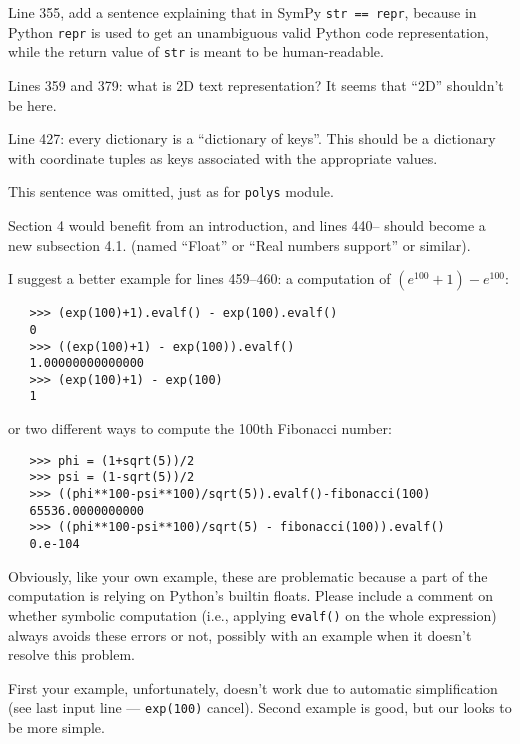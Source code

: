 \documentclass[answers,12pt]{exam}
\begin{document}
\begin{questions}
\question Line 355, add a sentence explaining that in SymPy \texttt{str == repr}, because in Python \texttt{repr} is used to get an unambiguous valid Python code representation, while the return value of \texttt{str} is meant to be human-readable.
\begin{solution}

\end{solution}

\question Lines 359 and 379: what is 2D text representation? It seems that ``2D'' shouldn't be here.
\begin{solution}

\end{solution}

\question Line 427: every dictionary is a ``dictionary of keys''. This should be a dictionary with coordinate tuples as keys associated with the appropriate values.
\begin{solution}
This sentence was omitted, just as for \texttt{polys} module.
\end{solution}

\question Section 4 would benefit from an introduction, and lines 440-- should become a new subsection 4.1. (named ``Float'' or ``Real numbers support'' or similar).
\begin{solution}

\end{solution}

\question I suggest a better example for lines 459--460: a computation of $(e^{100} +1)− e^{100}$:

\begin{verbatim}
   >>> (exp(100)+1).evalf() - exp(100).evalf()
   0
   >>> ((exp(100)+1) - exp(100)).evalf()
   1.00000000000000
   >>> (exp(100)+1) - exp(100)
   1
\end{verbatim}

or two different ways to compute the 100th Fibonacci number:

\begin{verbatim}
   >>> phi = (1+sqrt(5))/2
   >>> psi = (1-sqrt(5))/2
   >>> ((phi**100-psi**100)/sqrt(5)).evalf()-fibonacci(100)
   65536.0000000000
   >>> ((phi**100-psi**100)/sqrt(5) - fibonacci(100)).evalf()
   0.e-104
\end{verbatim}

Obviously, like your own example, these are problematic because a part of the computation is relying on Python's builtin floats. Please include a comment on whether symbolic computation (i.e., applying \texttt{evalf()} on the whole expression) always avoids these errors or not, possibly with an example when it doesn't resolve this problem.
\begin{solution}
First your example, unfortunately, doesn't work due to automatic
simplification (see last input line --- \texttt{exp(100)} cancel).
Second example is good, but our looks to be more simple.


\end{solution}
\end{questions}
\end{document}
